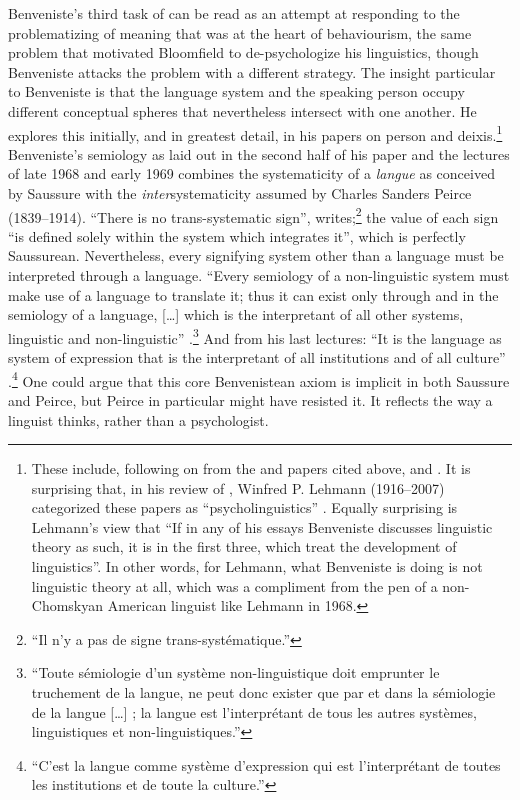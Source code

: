 \documentclass[output=paper]{langscibook}
\begin{document}
Benveniste's third task of \citeyear{Benveniste1954} can be read as an attempt at responding to the problematizing of meaning that was at the heart of behaviourism, the same problem that motivated Bloomfield to de-psychologize his linguistics, though Benveniste attacks the problem with a different strategy. The insight particular to Benveniste is that the language system and the speaking person occupy different conceptual spheres that nevertheless intersect with one another. He explores this initially, and in greatest detail, in his papers on person and deixis.\footnote{These include, following on from the \citeyear{Benveniste1946} and \citeyear{Benveniste1949} papers cited above, \citet{Benveniste1956nature} and \citet{Benveniste1958}. It is surprising that, in his review of \citet{Benveniste196674}, Winfred P. Lehmann (1916--2007) categorized these papers as ``psycholinguistics'' \citep{Lehmann1968}. Equally surprising is Lehmann's view that ``If in any of his essays Benveniste discusses linguistic theory as such, it is in the first three, which treat the development of linguistics''. In other words, for Lehmann, what Benveniste is doing is not linguistic theory at all, which was a compliment from the pen of a non-Chomskyan American linguist like Lehmann in 1968.} Benveniste's semiology as laid out in the second half of his \citeyear{Benveniste1969semiologie} paper and the lectures of late 1968 and early 1969 combines the systematicity of a \emph{langue} as conceived by Saussure with the \emph{inter}systematicity assumed by Charles Sanders Peirce (1839--1914). ``There is no trans-systematic sign'', \citet[53]{Benveniste1969semiologie} writes;\footnote{``Il n'y a pas de signe trans-systématique.''} the value of each sign ``is defined solely within the system which integrates it'', which is perfectly Saussurean. Nevertheless, every signifying system other than a language must be interpreted through a language. ``Every semiology of a non-linguistic system must make use of a language to translate it; thus it can exist only through and in the semiology of a language, […] which is the interpretant of all other systems, linguistic and non-linguistic'' \citep[60]{Benveniste1969semiologie}.\footnote{``Toute sémiologie d'un système non-linguistique doit emprunter le truchement de la langue, ne peut donc exister que par et dans la sémiologie de la langue […] ; la langue est l'interprétant de tous les autres systèmes, linguistiques et non-linguistiques.''} And from his last lectures: ``It is the language as system of expression that is the interpretant of all institutions and of all culture'' \citep[83]{Benveniste2012}.\footnote{``C'est la langue comme système d’expression qui est l'interprétant de toutes les institutions et de toute la culture.''} One could argue that this core Benvenistean axiom is implicit in both Saussure and Peirce, but Peirce in particular might have resisted it. It reflects the way a linguist thinks, rather than a psychologist.
\end{document}
